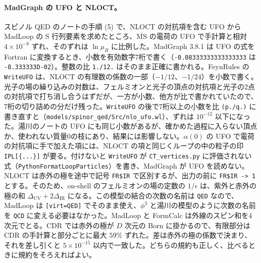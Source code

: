 \documentclass[a4paper,10pt]{ltjsarticle}
\begin{document}
\paragraph{MadGraph の UFO と NLOCT。}スピノル QED のノートの手順 (5) で、NLOCT の対抗項を含む UFO から MadLoop の S 行列要素を求めたところ、$\overline{\mathrm{MS}}$ の電荷の UFO で手計算と相対 $4\times10^{-8}$ ずれ、そのずれは $\ln\mu_R$ に比例した。MadGraph 3.8.1 は UFO の式を Fortran に変換するとき、小数を有効数字7桁で書く（\texttt{-0.08333333333333333} は \texttt{-8.333333D-02}）。整数の比 \texttt{1./12.} はそのまま正確に書かれる。FeynRules の \texttt{WriteUFO} は、NLOCT の有理数の係数の一部（$-1/12$、$-1/24$）を小数で書く。光子の場の繰り込みの対数は、フェルミオンと光子の頂点の対抗項と光子の2点の対抗項で打ち消し合うはずだが、一方が小数、他方が比で書かれていたので、7桁の切り詰めの分だけ残った。\texttt{WriteUFO} の後で7桁以上の小数を比 \texttt{(p./q.)} に書き直すと（\nolinkurl{models/spinor_qed/Src/nlo_ufo.wl}）、ずれは $10^{-12}$ 以下になった。湯川のノートの UFO にも同じ小数があるが、確かめた過程に入らない頂点か、使われない質量0の枝にあり、結果には影響しない。$\alpha(0)$ の UFO で電荷の対抗項に手で加えた項には、NLOCT の項と同じくループの中の粒子の印 \texttt{IPL[\{...\}]} が要る。付けないと \texttt{WriteUFO} が \texttt{CT\_vertices.py} に評価されない式（\texttt{PythonFormatLoopParticles}）を書き、MadGraph が UFO を読めない。NLOCT は赤外の極を途中で記号 \texttt{FR\$IR} で区別するが、出力の前に \texttt{FR\$IR -> 1} とする。そのため、on-shell のフェルミオンの場の定数の $1/\epsilon$ は、紫外と赤外の極の和 $\Delta_{\mathrm{UV}}+2\Delta_{\mathrm{IR}}$ になる。この模型の結合の次数の名前は \texttt{QED} なので、MadLoop は \texttt{[virt=QED]} でそのまま使え、$\phi^3$ と湯川の模型のように次数の名前を \texttt{QCD} に変える必要はなかった。MadLoop と FormCalc は外線のスピン和を4次元でとる。CDR では赤外の極が $D$ 次元の Born に掛かるので、有限部分は CDR の手計算と部分ごとに最大 $59\%$ ずれた。差は赤外の極の係数で決まり、それを差し引くと $5\times10^{-15}$ 以内で一致した。どちらの規約も正しく、比べるときに規約をそろえればよい。
\end{document}
